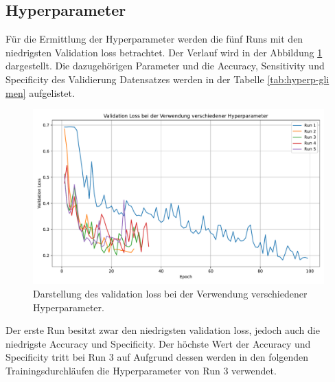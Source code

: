 \subsection{Hyperparameter}
Für die Ermittlung der Hyperparameter werden die fünf Runs mit den niedrigsten Validation loss betrachtet.
Der Verlauf wird in der Abbildung \ref{fig:val_loss gli-men} dargestellt.
Die dazugehörigen Parameter und die Accuracy, Sensitivity und Specificity des Validierung Datensatzes werden in der Tabelle \ref{tab:hyperp-gli men} aufgelistet.
\begin{figure}[H]
  \centering
  \includegraphics[scale=0.4]{plots/Val_loss_Gli_Men.pdf}
  \caption{Darstellung des validation loss bei der Verwendung verschiedener Hyperparameter.}
  \label{fig:val_loss gli-men}
\end{figure}
\begin{table}[H]
    \centering
  \caption{Die fünf Runs mit dem niedrigsten validation loss sowie deren verwendete Hyperparameter und aufgezeichnete Metriken.}
  \label{tab:hyperp-gli men}
\end{table}
Der erste Run besitzt zwar den niedrigsten validation loss, jedoch auch die niedrigste Accuracy und Specificity.
Der höchste Wert der Accuracy und Specificity tritt bei Run 3 auf
Aufgrund dessen werden in den folgenden Trainingsdurchläufen die Hyperparameter von Run 3 verwendet.

